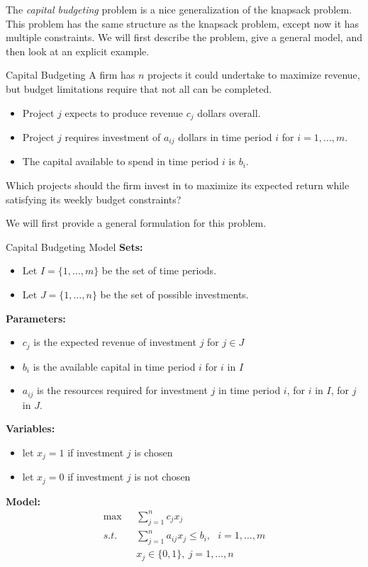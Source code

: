 
The \emph{capital budgeting} problem is a nice generalization of the knapsack problem.   This problem has the same structure as the knapsack problem, except now it has multiple constraints.   We will first describe the problem, give a general model, and then look at an explicit example.

\begin{general}{Capital Budgeting}{}
\label{general:capital-budgeting}
A firm has $n$ projects it could undertake to maximize revenue, but budget limitations require that not all can be completed.
\begin{itemize}
\item Project $j$ expects to produce revenue $c_j$ dollars overall.
\item Project $j$ requires investment of $a_{ij}$ dollars in time period $i$ for $i = 1,\ldots,m$.
\item The capital available to spend in time period $i$ is $b_i$.
\end{itemize}
Which projects should the firm invest in to maximize its expected return while satisfying its weekly budget constraints?
\end{general}

\newpage

We will first provide a general formulation for this problem.

\begin{general}{Capital Budgeting Model}{}
\noindent \textbf{Sets:}
\begin{itemize}
\item Let $I = \{1, \dots, m\}$ be the set of time periods.
\item Let $J = \{1, \dots, n\}$ be the set of possible investments.
\end{itemize}

\noindent \textbf{Parameters:}
\begin{itemize}
\item $c_j$ is the expected revenue of investment $j$ for $j \in J$
\item $b_i$ is the available capital in time period $i$ for $i$ in  $I$
\item $a_{ij}$ is the resources required for investment $j$ in time period $i$, for $i$ in $I$, for $j$ in $J$.
\end{itemize}

\noindent \textbf{Variables:}
\begin{itemize}
\item let $x_j = 1$ if investment $j$ is chosen
\item let $x_j = 0$ if investment $j$ is not chosen
\end{itemize}
\textbf{Model:}
\begin{align*}
	\max ~~~& \sum_{j = 1}^n c_jx_j \tag{Total Expected Revenue}\\
	s.t. ~~~&\sum_{j = 1}^n a_{ij}x_j\leq b_i, ~~~i = 1,\ldots,m \tag{ Resource constraint week $i$}\\
	& x_j \in \{0,1\} , \ j = 1,\ldots,n
	\end{align*}

\end{general}


